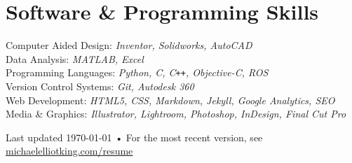 \documentclass[11pt, letterpaper]{article}
\newcommand{\years}[1]{\marginnote{\footnotesize #1}} %
\begin{document}


  \section*{Software \& Programming Skills}
  Computer Aided Design: \emph{Inventor, Solidworks, AutoCAD}\\
  Data Analysis: \emph{MATLAB, Excel}\\
  Programming Languages: \emph{Python, C, C}\verb!++!\emph{, Objective-C, ROS}\\
  Version Control Systems: \emph{Git, Autodesk 360}\\
  Web Development: \emph{HTML5, CSS, Markdown, Jekyll, Google Analytics, SEO}\\
  Media \& Graphics: \emph{Illustrator, Lightroom, Photoshop, InDesign, Final Cut Pro}



\begin{center}
{\hspace{-.5in} \scriptsize Last updated \today\- •\- For the most recent version, see \href{http://www.michaelelliotking.com/resume}{michaelelliotking.com/resume}}
\end{center}
\end{document}
